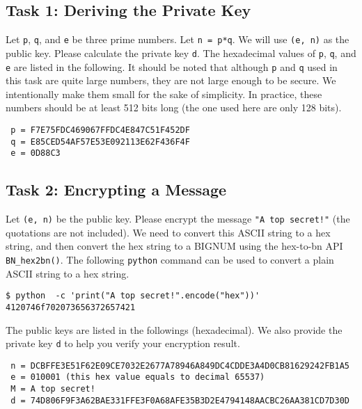 \subsection{Task 1: Deriving the Private Key}

Let \texttt{p}, \texttt{q}, and \texttt{e} be three prime numbers. Let \texttt{n = p*q}. 
We will use \texttt{(e, n)} as the public key. Please calculate the private key \texttt{d}.
The hexadecimal values of \texttt{p}, \texttt{q}, and \texttt{e} are listed in the following. It should be 
noted that although \texttt{p} and \texttt{q} used in this task are quite large numbers, they are not large
enough to be secure. We intentionally make them small for the sake of simplicity. In practice,
these numbers should be at least 512 bits long (the one used here are only 128 bits).

\begin{lstlisting}
 p = F7E75FDC469067FFDC4E847C51F452DF
 q = E85CED54AF57E53E092113E62F436F4F
 e = 0D88C3 
\end{lstlisting}
 

\subsection{Task 2: Encrypting a Message}

Let \texttt{(e, n)} be the public key. Please encrypt the message 
\texttt{"A top secret!"} (the quotations are not included).  
We need to convert this ASCII string to a hex string, and then
convert the hex string to a BIGNUM using the hex-to-bn API \texttt{BN\_hex2bn()}. 
The following \texttt{python} command can be used 
to convert a plain ASCII string to a hex string. 

\begin{lstlisting}
$ python  -c 'print("A top secret!".encode("hex"))'
4120746f702073656372657421
\end{lstlisting}


The public keys are listed in the followings (hexadecimal).  We also provide the private key \texttt{d} 
 to help you verify your encryption
result. 

\begin{lstlisting}
 n = DCBFFE3E51F62E09CE7032E2677A78946A849DC4CDDE3A4D0CB81629242FB1A5
 e = 010001 (this hex value equals to decimal 65537)
 M = A top secret!
 d = 74D806F9F3A62BAE331FFE3F0A68AFE35B3D2E4794148AACBC26AA381CD7D30D 
\end{lstlisting}



